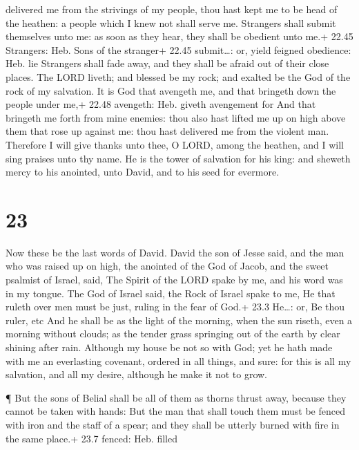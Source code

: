 delivered me from the strivings of my people, thou hast kept me to be
head of the heathen: a people which I knew not shall serve me.
 Strangers shall submit themselves unto me: as soon as they
hear, they shall be obedient unto me.+ 22.45 Strangers: Heb. Sons of the
stranger+ 22.45 submit\ldots: or, yield feigned obedience: Heb. lie
 Strangers shall fade away, and they shall be afraid out of
their close places.  The LORD liveth; and blessed be my
rock; and exalted be the God of the rock of my salvation. 
It is God that avengeth me, and that bringeth down the people under me,+
22.48 avengeth: Heb. giveth avengement for  And that
bringeth me forth from mine enemies: thou also hast lifted me up on high
above them that rose up against me: thou hast delivered me from the
violent man.  Therefore I will give thanks unto thee, O
LORD, among the heathen, and I will sing praises unto thy name.
 He is the tower of salvation for his king: and sheweth
mercy to his anointed, unto David, and to his seed for evermore.

\hypertarget{section-22}{%
\section{23}\label{section-22}}

 Now these be the last words of David. David the son of
Jesse said, and the man who was raised up on high, the anointed of the
God of Jacob, and the sweet psalmist of Israel, said,  The
Spirit of the LORD spake by me, and his word was in my tongue.
 The God of Israel said, the Rock of Israel spake to me, He
that ruleth over men must be just, ruling in the fear of God.+ 23.3
He\ldots: or, Be thou ruler, etc  And he shall be as the
light of the morning, when the sun riseth, even a morning without
clouds; as the tender grass springing out of the earth by clear shining
after rain.  Although my house be not so with God; yet he
hath made with me an everlasting covenant, ordered in all things, and
sure: for this is all my salvation, and all my desire, although he make
it not to grow.

 ¶ But the sons of Belial shall be all of them as thorns
thrust away, because they cannot be taken with hands:  But
the man that shall touch them must be fenced with iron and the staff of
a spear; and they shall be utterly burned with fire in the same place.+
23.7 fenced: Heb. filled

